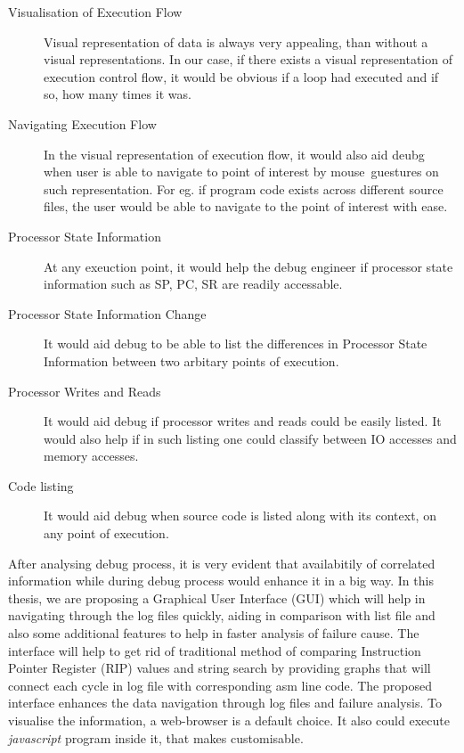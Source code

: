 \begin{description}
\item[Visualisation of Execution Flow] Visual representation of data is always very appealing, than without a visual representations. In our case, if there exists a visual representation of execution control flow, it would be obvious if a loop had executed and if so, how many times it was.
\item[Navigating Execution Flow] In the visual representation of execution flow, it would also aid deubg when user is able to navigate to point of interest by mouse~guestures on such representation. For eg. if program code exists across different source files, the user would be able to navigate to the point of interest with ease.
\item[Processor State Information] At any exeuction point, it would help the debug engineer if processor state information such as SP, PC, SR are readily accessable.
\item[Processor State Information Change] It would aid debug to be able to list the differences in Processor State Information between two arbitary points of execution.
\item[Processor Writes and Reads] It would aid debug if processor writes and reads could be easily listed. It would also help if in such listing one could classify between IO accesses and memory accesses.
\item[Code listing] It would aid debug when source code is listed along with its context, on any point of execution.
\end{description}

After analysing debug process, it is very evident that availabitily of correlated information while during debug process would enhance it in a big way.  In this thesis, we are proposing a Graphical User Interface (GUI) which will help in navigating through the log files quickly, aiding in comparison with list file and also some additional features to help in faster analysis of failure cause. The interface will help to get rid of traditional method of comparing Instruction Pointer Register (RIP) values and string search by providing graphs that will connect each cycle in log file with corresponding asm line code. The proposed interface enhances the data navigation through log files and failure analysis.  To visualise the information, a web-browser is a default choice. It also could execute {\it javascript} program inside it, that makes customisable.

